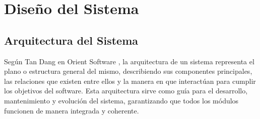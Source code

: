 \section{Diseño del Sistema}

\subsection{Arquitectura del Sistema}
Según Tan Dang en Orient Software \cite{Arquitectura}, la arquitectura de un sistema representa el plano o estructura general del mismo, describiendo sus componentes principales, 
las relaciones que existen entre ellos y la manera en que interactúan para cumplir los objetivos del software.
Esta arquitectura sirve como guía para el desarrollo, mantenimiento y evolución del sistema, garantizando que todos los módulos funcionen de manera integrada y coherente.

